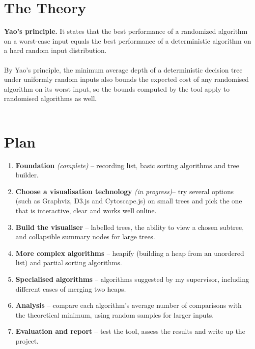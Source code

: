 ﻿\documentclass[10pt,a4paper]{article}
\begin{document}
\section{The Theory}
\textbf{Yao's principle.}
 It states that the best performance of a randomized algorithm on a worst-case input equals the best performance of a deterministic algorithm on a hard random input distribution. \\\\
 By Yao's principle, the minimum average depth of a deterministic decision tree under uniformly random inputs also bounds the expected cost of any randomised algorithm on its worst input, so the bounds computed by the tool apply to randomised algorithms as well.
\\
\\
\section{Plan}
\begin{enumerate}
  \item \textbf{Foundation} \textit{(complete)} -- recording list, basic sorting
        algorithms and tree builder.
  \item \textbf{Choose a visualisation technology} \textit{(in progress)}-- try several options (such as
        Graphviz, D3.js and Cytoscape.js) on small trees and pick the one that is
        interactive, clear and works well online.
  \item \textbf{Build the visualiser} -- labelled trees, the ability to view a chosen
        subtree, and collapsible summary nodes for large trees.
  \item \textbf{More complex algorithms} -- heapify (building a heap from an unordered
        list) and partial sorting algorithms.
  \item \textbf{Specialised algorithms} -- algorithms suggested by my supervisor,
        including different cases of merging two heaps.
  \item \textbf{Analysis} -- compare each algorithm's average number of comparisons with
        the theoretical minimum, using random samples for larger inputs.
  \item \textbf{Evaluation and report} -- test the tool, assess the results and write up
        the project.
\end{enumerate}
\end{document}
